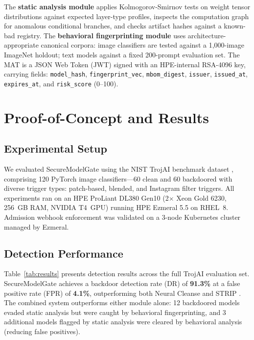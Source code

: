 \documentclass[10pt,twocolumn]{article}
\begin{document}
The \textbf{static analysis module} applies Kolmogorov-Smirnov tests on
weight tensor distributions against expected layer-type profiles, inspects
the computation graph for anomalous conditional branches, and checks artifact
hashes against a known-bad registry. The \textbf{behavioral fingerprinting
module} uses architecture-appropriate canonical corpora: image classifiers
are tested against a 1,000-image ImageNet holdout; text models against a
fixed 200-prompt evaluation set. The MAT is a JSON Web Token (JWT) signed
with an HPE-internal RSA-4096 key, carrying fields:
\texttt{model\_hash}, \texttt{fingerprint\_vec},
\texttt{mbom\_digest}, \texttt{issuer}, \texttt{issued\_at},
\texttt{expires\_at}, and \texttt{risk\_score} (0--100).

\section{Proof-of-Concept and Results}

\subsection{Experimental Setup}

We evaluated SecureModelGate using the NIST TrojAI benchmark dataset
\cite{trojAI2021}, comprising 120 PyTorch image classifiers---60 clean and 60
backdoored with diverse trigger types: patch-based, blended, and Instagram
filter triggers. All experiments ran on an HPE ProLiant DL380 Gen10
(2$\times$ Xeon Gold 6230, 256~GB RAM, NVIDIA T4~GPU) running
HPE Ezmeral 5.5 on RHEL~8. Admission webhook enforcement
was validated on a 3-node Kubernetes cluster managed by Ezmeral.

\subsection{Detection Performance}

Table~\ref{tab:results} presents detection results across the full TrojAI
evaluation set. SecureModelGate achieves a backdoor detection rate (DR) of
\textbf{91.3\%} at a false positive rate (FPR) of \textbf{4.1\%},
outperforming both Neural Cleanse \cite{wang2019neural} and STRIP
\cite{gao2019strip}. The combined system outperforms either module alone:
12 backdoored models evaded static analysis but were caught by behavioral
fingerprinting, and 3 additional models flagged by static analysis were
cleared by behavioral analysis (reducing false positives).
\end{document}
